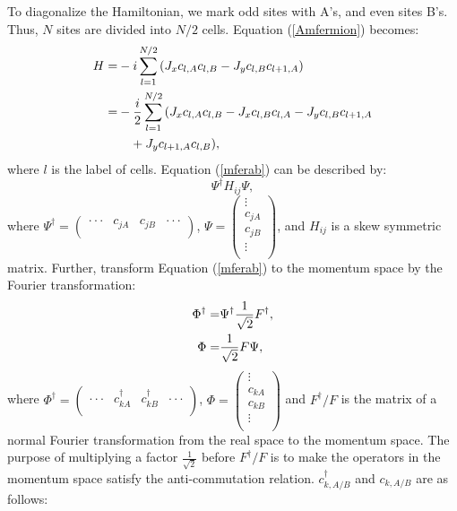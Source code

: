 \documentclass[twocolumn,floats,superscriptaddress]{revtex4}
\begin{document}
To diagonalize the Hamiltonian, we mark odd sites {with A's}, and even sites {B's}. Thus, $N$ sites are divided into $N/2$ cells. Equation (\ref{Amfermion}) becomes:
\begin{align}\label{mferab}
H=&-i\sum_{l=1}^{N/2}{(J_x c_{l, A}c_{l, B}-J_yc_{l, B}c_{l+1, A})}\notag
\\ %
=&-\frac{i}{2}\sum_{l=1}^{N/2}{(J_x c_{l, A}c_{l, B}-J_x c_{l, B}c_{l, A}-J_yc_{l, B}c_{l+1, A} }\notag \\
&\quad+J_y c_{l+1, A}c_{l, B}),
\end{align}
where $l$ is the {label} of cells. Equation (\ref{mferab}) can be described by:
\begin{equation}\label{}
 \Psi^\dag H_{ij}\Psi,
\end{equation}
where $\Psi^\dag=\left(
 \begin{array}{cccc}
 \cdot\cdot\cdot & c_{jA} & c_{jB} & \cdot\cdot\cdot \\
 \end{array}
\right)$, $\Psi=\left(
   \begin{array}{c}
   \vdots \\
   c_{jA} \\
   c_{jB}\\
   \vdots\\
   \end{array}
  \right)
$, and $H_{ij}$ is a skew symmetric matrix.
Further, transform Equation (\ref{mferab}) to the momentum space by the Fourier transformation:
\begin{align}\label{phi}
 \Phi^\dag =&\Psi^\dag \frac{1}{\sqrt 2}F^\dag, \notag\\
 \Phi =&\frac{1}{\sqrt 2}F\Psi,
\end{align}
where $\Phi^\dag=\left(
 \begin{array}{cccc}
 \cdot\cdot\cdot & c_{kA}^\dag & c_{kB}^\dag & \cdot\cdot\cdot \\
 \end{array}
\right)$, $\Phi=\left(
   \begin{array}{c}
   \vdots \\
   c_{kA} \\
   c_{kB}\\
   \vdots\\
   \end{array}
  \right)
$ and $F^\dag/F$ is the matrix of a normal Fourier transformation from the real space to the momentum space. The purpose of multiplying a factor $\frac{1}{\sqrt2}$ before $F^\dag/F$ is to make the operators in the momentum space satisfy the anti-commutation relation. $c_{k,A/B}^\dag$ and $c_{k,A/B}$ are as follows:
\end{document}
